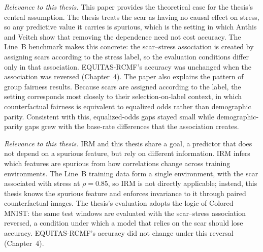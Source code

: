 \textit{Relevance to this thesis.} This paper provides the theoretical case for the thesis's central assumption. The thesis treats the scar as having no causal effect on stress, so any predictive value it carries is spurious, which is the setting in which Anthis and Veitch show that removing the dependence need not cost accuracy. The Line~B benchmark makes this concrete: the scar--stress association is created by assigning scars according to the stress label, so the evaluation conditions differ only in that association. EQUITAS-RCMF's accuracy was unchanged when the association was reversed (Chapter~4). The paper also explains the pattern of group fairness results. Because scars are assigned according to the label, the setting corresponds most closely to their selection-on-label context, in which counterfactual fairness is equivalent to equalized odds rather than demographic parity. Consistent with this, equalized-odds gaps stayed small while demographic-parity gaps grew with the base-rate differences that the association creates.


\textit{Relevance to this thesis.} IRM and this thesis share a goal, a predictor that does not depend on a spurious feature, but rely on different information. IRM infers which features are spurious from how correlations change across training environments. The Line~B training data form a single environment, with the scar associated with stress at $\rho = 0.85$, so IRM is not directly applicable; instead, this thesis knows the spurious feature and enforces invariance to it through paired counterfactual images. The thesis's evaluation adopts the logic of Colored MNIST: the same test windows are evaluated with the scar--stress association reversed, a condition under which a model that relies on the scar should lose accuracy. EQUITAS-RCMF's accuracy did not change under this reversal (Chapter~4).


